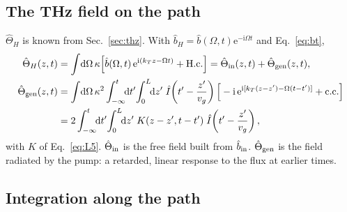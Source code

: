 \documentclass[aps,pra,onecolumn,notitlepage,11pt,amsmath,amssymb,nofootinbib]{revtex4-2}
\newcommand{\Iop}{\hat I}
\newcommand{\dd}{\mathrm{d}}
\newcommand{\ee}{\mathrm{e}}
\newcommand{\ii}{\mathrm{i}}
\begin{document}
\subsection{The THz field on the path}

$\hat\Theta_H$ is known from Sec.~\ref{sec:thz}. With
$\hat b_H=\hat b(\Omega,t)\ee^{-\ii\Omega t}$ and Eq.~\eqref{eq:bt},
\begin{align}
\hat\Theta_H(z,t)&=\int\!\dd\Omega\,\kappa\Big[\hat b(\Omega,t)\,\ee^{\ii(k_Tz-\Omega t)}+\mathrm{H.c.}\Big]
=\hat\Theta_{\rm in}(z,t)+\hat\Theta_{\rm gen}(z,t),\\
\hat\Theta_{\rm gen}(z,t)&=\int\!\dd\Omega\,\kappa^2\int_{-\infty}^{t}\!\!\dd t'\!\int_0^L\!\!\dd z'\;
\Iop\!\left(t'-\frac{z'}{v_g}\right)
\Big[-\ii\,\ee^{\ii[k_T(z-z')-\Omega(t-t')]}+\mathrm{c.c.}\Big]\nonumber\\
&=2\int_{-\infty}^{t}\!\!\dd t'\!\int_0^L\!\!\dd z'\;K(z-z',t-t')\;
\Iop\!\left(t'-\frac{z'}{v_g}\right),
\label{eq:gen}
\end{align}
with $K$ of Eq.~\eqref{eq:L5}. $\hat\Theta_{\rm in}$ is the free field built
from $\hat b_{\rm in}$. $\hat\Theta_{\rm gen}$ is the field radiated by the
pump: a retarded, linear response to the flux at earlier times.

\subsection{Integration along the path}
\end{document}
